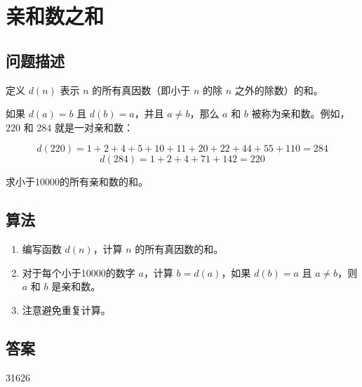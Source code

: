 \section{亲和数之和}
\subsection{问题描述}
\begin{tcolorbox}
	定义 $d(n)$ 表示 $n$ 的所有真因数（即小于 $n$ 的除 $n$ 之外的除数）的和。

	如果 $d(a) = b$ 且 $d(b) = a$，并且 $a \neq b$，那么 $a$ 和 $b$ 被称为亲和数。例如，220 和 284 就是一对亲和数：

	\[
		d(220) = 1 + 2 + 4 + 5 + 10 + 11 + 20 + 22 + 44 + 55 + 110 = 284
	\]
	\[
		d(284) = 1 + 2 + 4 + 71 + 142 = 220
	\]

	求小于10000的所有亲和数的和。
\end{tcolorbox}

\subsection{算法}
\begin{enumerate}
	\item 编写函数 $d(n)$，计算 $n$ 的所有真因数的和。
	\item 对于每个小于10000的数字 $a$，计算 $b = d(a)$，如果 $d(b) = a$ 且 $a \neq b$，则 $a$ 和 $b$ 是亲和数。
	\item 注意避免重复计算。
\end{enumerate}

\subsection{答案}
31626
